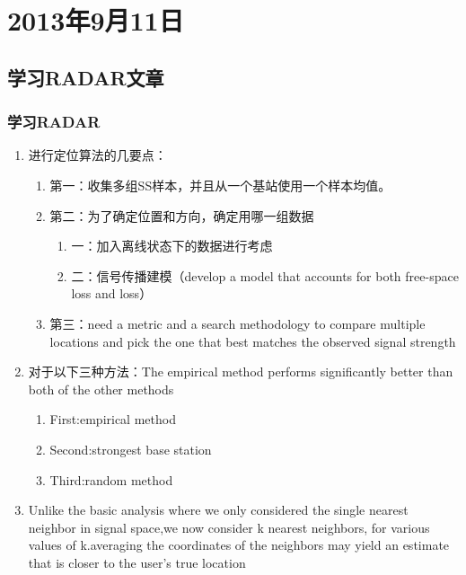 \chapter{2013年9月11日}
\section{学习RADAR文章}
\subsection{学习RADAR}
\begin{enumerate}
    \item
    进行定位算法的几要点：
    \begin{enumerate}
    \item
    第一：收集多组SS样本，并且从一个基站使用一个样本均值。
    \item
    第二：为了确定位置和方向，确定用哪一组数据
    \begin{enumerate}
    \item
    一：加入离线状态下的数据进行考虑
    \item
    二：信号传播建模（develop a model that accounts for both free-space loss and loss）
    \end{enumerate}
    \item
     第三：need a metric and a search methodology to compare multiple locations and pick the one that best matches the observed signal strength
    \end{enumerate}
    \item
    对于以下三种方法：The empirical method performs significantly better than both of the other methods
    \begin{enumerate}
    \item
    First:empirical method
    \item
    Second:strongest base station
    \item
    Third:random method
    \end{enumerate}
    \item
    Unlike the basic analysis where we only considered the single nearest neighbor in signal space,we now consider k nearest neighbors, for various values of k.averaging the coordinates of the neighbors may yield an estimate that is closer to the user’s true location
\end{enumerate}
